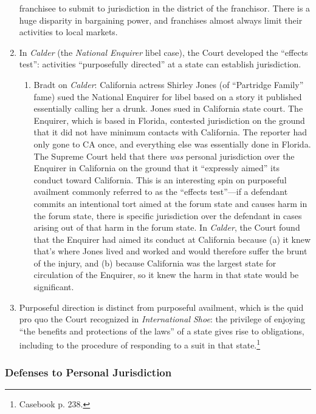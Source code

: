 \begin{enumerate}
    franchisee to submit to jurisdiction in the district of the franchisor. 
    There is a huge disparity in bargaining power, and franchises almost 
    always limit their activities to local markets.
    \item In \emph{Calder} (the \emph{National Enquirer} libel case), the 
    Court developed the ``effects test'': activities ``purposefully 
    directed'' at a state can establish jurisdiction.
    \begin{enumerate}
        \item Bradt on \emph{Calder}: 
        California actress Shirley Jones (of ``Partridge Family'' fame) sued 
        the National Enquirer for libel based on a story it published 
        essentially calling her a drunk. Jones sued in California state 
        court. The Enquirer, which is based in Florida, contested 
        jurisdiction on the ground that it did not have minimum contacts with 
        California. The reporter had only gone to CA once, and everything 
        else was essentially done in Florida. The Supreme Court held that 
        there \emph{was} personal jurisdiction over the Enquirer in California 
        on the ground that it ``expressly aimed'' its conduct toward 
        California. This is an interesting spin on purposeful availment 
        commonly referred to as the ``effects test''---if a defendant commits 
        an intentional tort aimed at the forum state and causes harm in the 
        forum state, there is specific jurisdiction over the defendant in 
        cases arising out of that harm in the forum state. In \emph{Calder}, 
        the Court found that the Enquirer had aimed its conduct at California 
        because (a) it knew that's where Jones lived and worked and would 
        therefore suffer the brunt of the injury, and (b) because California 
        was the largest state for circulation of the Enquirer, so it knew the 
        harm in that state would be significant. 
    \end{enumerate}
    \item Purposeful direction is distinct from purposeful availment, which is 
    the quid pro quo the Court recognized in \emph{International Shoe}: the 
    privilege of enjoying ``the benefits and protections of the laws'' of a 
    state gives rise to obligations, including to the procedure of responding 
    to a suit in that state.\footnote{Casebook p. 238.}
\end{enumerate}

\subsubsection{Defenses to Personal Jurisdiction}

